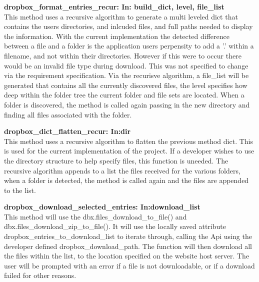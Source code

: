 \textbf{dropbox\_format\_entries\_recur: In: build\_dict, level, file\_list} \\
    This method uses a recursive algorithm to generate a multi leveled dict that contains the users directories, and inlcuded files, and full
    paths needed to display the information. With the current implementation the detected difference between a file and a folder is the application
    users perpensity to add a '.' within a filename, and not within their directories. However if this were to occur there would be an invalid file
    type during download. This was not specified to change via the requirement specification. Via the recurisve algorithm, a file\_list will be 
    generated that contains all the currently discovered files, the level specifies how deep within the folder tree the current folder and file sets 
    are located. When a folder is discovered, the method is called again passing in the new directory and finding all files associated with the folder.

\textbf{dropbox\_dict\_flatten\_recur: In:dir} \\
    This method uses a recursive algorithm to flatten the previous method dict. This is used for the current implementation of the project. If 
    a developer wishes to use the directory structure to help specify files, this function is uneeded. The recursive algorithm appends to a list the 
    files received for the various folders, when a folder is detected, the method is called again and the files are appended to the list.

\textbf{dropbox\_download\_selected\_entries: In:download\_list} \\
    This method will use the dbx.files\_download\_to\_file() and dbx.files\_download\_zip\_to\_file(). It will use the locally saved attribute 
    dropbox\_entries\_to\_download\_list to iterate through, calling the Api using the developer defined dropbox\_download\_path. The function 
    will then download all the files within the list, to the location specified on the website host server. The user will be prompted with an 
    error if a file is not downloadable, or if a download failed for other reasons.

